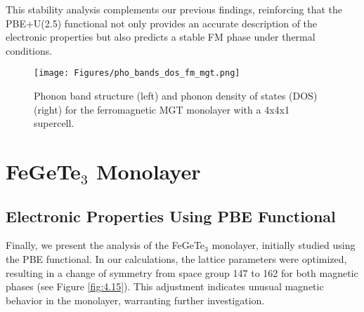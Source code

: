 This stability analysis complements our previous findings, reinforcing that the PBE+U(2.5) functional not only provides an accurate description of the electronic properties but also predicts a stable FM phase under thermal conditions.

\begin{figure}[H]
	\centering
	\texttt{[image: Figures/pho\_bands\_dos\_fm\_mgt.png]}
	\caption{Phonon band structure (left) and phonon density of states (DOS) (right) for the ferromagnetic MGT monolayer with a 4x4x1 supercell.}
	\label{fig:4.14}
\end{figure}


\section{FeGeTe\texorpdfstring{$_3$}{} Monolayer}

\subsection{Electronic Properties Using PBE Functional}

Finally, we present the analysis of the FeGeTe\(_3\) monolayer, initially studied using the PBE functional. In our calculations, the lattice parameters were optimized, resulting in a change of symmetry from space group 147 to 162 for both magnetic phases (see Figure \ref{fig:4.15}). This adjustment indicates unusual magnetic behavior in the monolayer, warranting further investigation.

